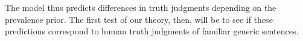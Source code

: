 \documentclass[12pt,letterpaper]{article}
\newcommand{\denote}[1]{\mbox{ $[\![ #1 ]\!]$}}
\begin{document}
%    



The model thus predicts differences in truth judgments depending on the prevalence prior. 
The first test of our theory, then, will be to see if these predictions correspond to human truth judgments of familiar generic sentences. 

%
%
%
%
%



\end{document}
